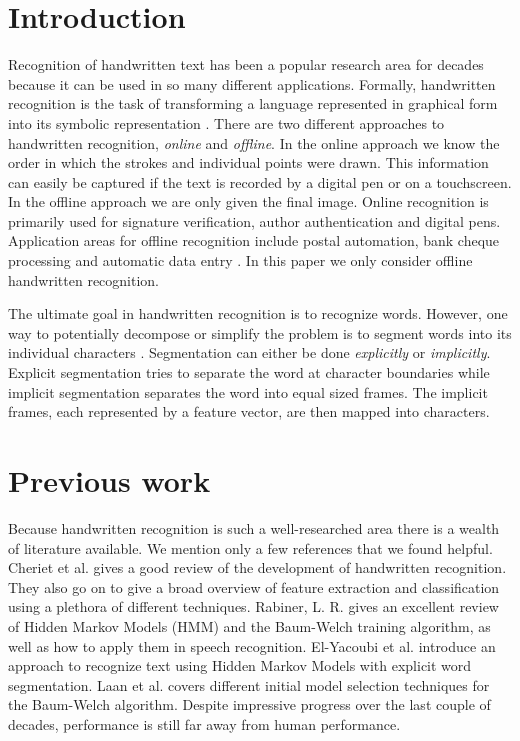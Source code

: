 \section{Introduction}

Recognition of handwritten text has been a popular research area for decades because it can be used in so many different applications.
Formally, handwritten recognition is the task of transforming a language represented in graphical form into its symbolic representation \cite{introsurvey}.
There are two different approaches to handwritten recognition, \textit{online} and \textit{offline}.
In the online approach we know the order in which the strokes and individual points were drawn.
This information can easily be captured if the text is recorded by a digital pen or on a touchscreen.
In the offline approach we are only given the final image.
Online recognition is primarily used for signature verification, author authentication and digital pens.
Application areas for offline recognition include postal automation, bank cheque processing and automatic data entry \cite{intro1}.
In this paper we only consider offline handwritten recognition.

The ultimate goal in handwritten recognition is to recognize words.
However, one way to potentially decompose or simplify the problem is to segment words into its individual characters \cite{intro-Yacoubi}. 
Segmentation can either be done \textit{explicitly} or \textit{implicitly}.
Explicit segmentation tries to separate the word at character boundaries while implicit segmentation separates the word into equal sized frames.
The implicit frames, each represented by a feature vector, are then mapped into characters.

\section{Previous work}
Because handwritten recognition is such a well-researched area there is a wealth of literature available.
We mention only a few references that we found helpful.
Cheriet et al. \cite{Cheriet} gives a good review of the development of handwritten recognition.
They also go on to give a broad overview of feature extraction and classification using a plethora of different techniques.
Rabiner, L. R. \cite{Rabiner1989} gives an excellent review of Hidden Markov Models (HMM) and the Baum-Welch training algorithm, as well as how to apply them in speech recognition.
El-Yacoubi et al. \cite{intro-Yacoubi} introduce an approach to recognize text using Hidden Markov Models with explicit word segmentation.
Laan et al. \cite{initialmodel} covers different initial model selection techniques for the Baum-Welch algorithm.
Despite impressive progress over the last couple of decades, performance is still far away from human performance.


